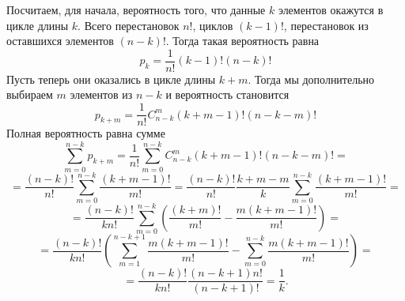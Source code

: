 \documentclass{article}
\begin{document}
Посчитаем, для начала, вероятность того, что данные $k$ элементов окажутся в цикле длины $k$. Всего перестановок $n!$, 
циклов $(k-1)!$, перестановок из оставшихся элементов $(n - k)!$. Тогда такая вероятность равна
$$p_k = \frac{1}{n!} (k-1)! (n-k)!$$
Пусть теперь они оказались в цикле длины $k+m$. Тогда мы дополнительно выбираем $m$ элементов из $n-k$ и вероятность становится
$$p_{k+m} = \frac{1}{n!} C^m_{n-k} (k+m-1)! (n-k-m)!$$
Полная вероятность равна сумме
$$\sum_{m=0}^{n-k} p_{k+m} = \frac{1}{n!} \sum_{m=0}^{n-k} C^m_{n-k} (k+m-1)! (n-k-m)! = $$
$$ = \frac{(n-k)!}{n!} \sum_{m=0}^{n-k} \frac{(k+m-1)!}{m!} = \frac{(n-k)!}{n!} \frac{k+m-m}{k} \sum_{m=0}^{n-k} \frac{(k+m-1)!}{m!} = $$
$$= \frac{(n-k)!}{kn!} \sum_{m=0}^{n-k} \left( \frac{(k+m)!}{m!} - \frac{m(k+m-1)!}{m!} \right) = $$
$$ = \frac{(n-k)!}{kn!} \left( \sum_{m=1}^{n-k+1} \frac{m(k+m-1)!}{m!} - \sum_{m=0}^{n-k} \frac{m(k+m-1)!}{m!} \right) = $$
$$ = \frac{(n-k)!}{kn!} \frac{(n-k+1)n!}{(n-k+1)!} = \frac{1}{k}.$$
\end{document}
